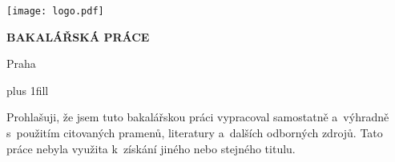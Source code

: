 

\hypersetup{pageanchor=false}

\begin{center}

\centerline{\mbox{\texttt{[image: logo.pdf]}}}

\vspace{-8mm}
\vfill

{\bf\Large BAKALÁŘSKÁ PRÁCE}

\vfill

{\LARGE\AutorPrace}

\vspace{15mm}

{
	\begin{spacing}{1.0}
		\LARGE\bfseries\NazevPrace
	\end{spacing}
}

\vfill

\Katedra

\vfill

{
\centerline{\vbox{}}}

\vfill

Praha \RokOdevzdani
\end{center}

\ifdefined\printVersion
	\cleardoublepage
\else
\fi

\newpage



\ifdefined\printVersion
\else
	\afterpage{\aftergroup\restoregeometry}
\fi

\hypersetup{pageanchor=true}
\pagestyle{plain}
\vglue 0pt plus 1fill

\noindent
Prohlašuji, že jsem tuto bakalářskou práci vypracoval samostatně a~výhradně
s~použitím citovaných pramenů, literatury a~dalších odborných zdrojů.
Tato práce nebyla využita k~získání jiného nebo stejného titulu.


